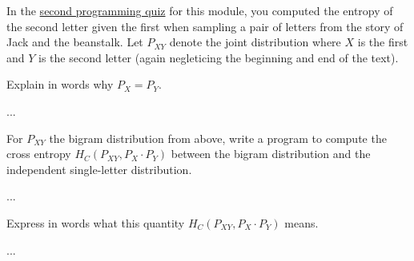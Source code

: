 \documentclass[a4paper,10pt]{article}
\begin{document}
\begin{subproblem}{1}
In the \href{https://canvas.uva.nl/courses/10933/assignments/72715}{second programming quiz} for this module, you computed the entropy of the second letter given the first when sampling a pair of letters from the story of Jack and the beanstalk. Let $P_{XY}$ denote the joint distribution where $X$ is the first and $Y$ is the second letter (again negleticing the beginning and end of the text).

Explain in words why $P_X = P_Y$.
\end{subproblem}

\begin{solution}
...
\end{solution}

\begin{subproblem}{2}
For $P_{XY}$ the bigram distribution from above, write a program to compute the cross entropy $H_C(P_{XY} , P_X \cdot P_Y)$ between the bigram distribution and the independent single-letter distribution.
\end{subproblem}

\begin{solution}
...
\end{solution}

\begin{subproblem}{1}
Express in words what this quantity  $H_C(P_{XY} , P_X \cdot P_Y)$ means.
\end{subproblem}

\begin{solution}
...
\end{solution}
\end{document}
